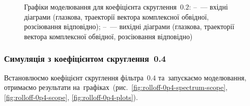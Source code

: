 \documentclass[
	a4paper,
	oneside,
	BCOR = 10mm,
	DIV = 12,
	12pt,
	headings = normal,
]{scrartcl}
\begin{document}
\begin{figure}[!htbp]
\begin{subfigure}{\textwidth / 3}
						\caption{}
						\label{subfig:rolloff-0p2-scatter-plot-out}
					\end{subfigure}%
					\caption{Графіки моделювання для коефіцієнта скруглення~$0.2$: –~— вхідні діаграми (глазкова, траекторії вектора комплексної обвідної, розсіювання відповідно); –~— вихідні діаграми (глазкова, траекторії вектора комплексної обвідної, розсіювання відповідно)}
					\label{fig:rolloff-0p2-plots}
				\end{figure}

			\clearpage
			\subsubsection{Симуляція з коефіцієнтом скруглення~0.4}
				Встановлюємо коефіцієнт скруглення фільтра~$0.4$ та~запускаємо моделювання, отримаємо результати на~графіках~(рис.~\ref{fig:rolloff-0p4-spectrum-scope}, \ref{fig:rolloff-0p4-scope}, \ref{fig:rolloff-0p4-plots}).
\end{document}
